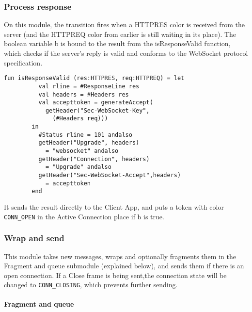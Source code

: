 		
		
	\subsubsection{Process response}
		
		
		On this module, the transition fires when a HTTPRES color is received from the
		server (and the HTTPREQ color from earlier is still waiting in its place). The
		boolean variable b is bound to the result from the isResponseValid function,
		which checks if the server's reply is valid and conforms to the WebSocket
		protocol specification.
		
		\begin{lstlisting}[label=lst:isResponseValid,caption=isResponseValid,gobble=2]
		fun isResponseValid (res:HTTPRES, req:HTTPREQ) = let
		  val rline = #ResponseLine res
		  val headers = #Headers res
		  val accepttoken = generateAccept(
		    getHeader("Sec-WebSocket-Key",
		      (#Headers req)))
		in
		  #Status rline = 101 andalso
		  getHeader("Upgrade", headers) 
		    = "websocket" andalso
		  getHeader("Connection", headers) 
		    = "Upgrade" andalso
		  getHeader("Sec-WebSocket-Accept",headers)
		    = accepttoken
		end
		\end{lstlisting}
		
		It sends the result directly to the Client App, and puts a token with color
		\lstinline:CONN_OPEN: in the Active Connection place if b is true.
		
	\subsubsection{Wrap and send}
		
		
		This module takes new messages, wraps and optionally fragments them in the
		Fragment and queue submodule (explained below), and sends them if there is
		an open connection. If a Close frame is being sent,the
		connection state will be changed to \lstinline:CONN_CLOSING:, which prevents
		further sending.
		
		\paragraph{Fragment and queue}
			
			
